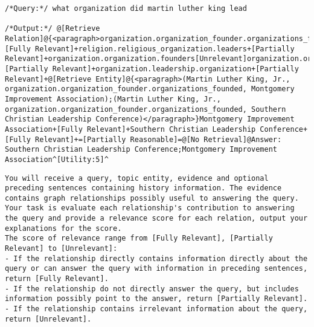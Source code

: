 \begin{figure*}[htbp]

\begin{tcolorbox}[left=1mm,right=1mm,top=0.mm, bottom=0mm,colback=white]
\begin{lstlisting}
/*Query:*/ what organization did martin luther king lead

/*Output:*/ @[Retrieve Relation]@{<paragraph>organization.organization_founder.organizations_founded;religion.religious_organization.leaders;organization.organization.founders;organization.organization.leadership;organization.leadership.organization</paragraph>}organization.organization_founder.organizations_founded+[Fully Relevant]+religion.religious_organization.leaders+[Partially Relevant]+organization.organization.founders[Unrelevant]organization.organization.leadership+[Partially Relevant]+organization.leadership.organization+[Partially Relevant]+@[Retrieve Entity]@{<paragraph>(Martin Luther King, Jr., organization.organization_founder.organizations_founded, Montgomery Improvement Association);(Martin Luther King, Jr., organization.organization_founder.organizations_founded, Southern Christian Leadership Conference)</paragraph>}Montgomery Improvement Association+[Fully Relevant]+Southern Christian Leadership Conference+[Fully Relevant]+=[Partially Reasonable]=@[No Retrieval]@Answer: Southern Christian Leadership Conference;Montgomery Improvement Association^[Utility:5]^
\end{lstlisting}
\end{tcolorbox}
\caption{An example of \model training data.}
\label{app:train_data}
\end{figure*}


\begin{figure*}[htbp]
\begin{tcolorbox}[left=1mm,right=1mm,top=0.mm, bottom=0mm,colback=white]
\begin{lstlisting}
You will receive a query, topic entity, evidence and optional preceding sentences containing history information. The evidence contains graph relationships possibly useful to answering the query. Your task is evaluate each relationship's contribution to answering the query and provide a relevance score for each relation, output your explanations for the score.
The score of relevance range from [Fully Relevant], [Partially Relevant] to [Unrelevant]:
- If the relationship directly contains information directly about the query or can answer the query with information in preceding sentences, return [Fully Relevant].
- If the relationship do not directly answer the query, but includes information possibly point to the answer, return [Partially Relevant].
- If the relationship contains irrelevant information about the query, return [Unrelevant].
\end{lstlisting}
\end{tcolorbox}
\caption{Instructions for \crel (for relations).}
\label{fig:pro-rrel}
\end{figure*}

